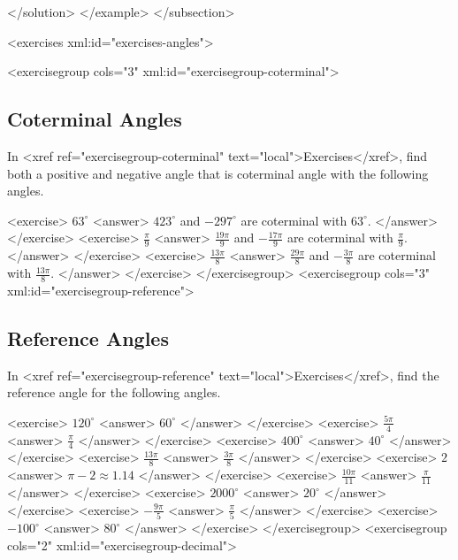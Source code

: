       </solution>
    </example>
  </subsection>

    <exercises xml:id="exercises-angles">

    <exercisegroup cols="3" xml:id="exercisegroup-coterminal">
      \subsection*{Coterminal Angles}
        
            In <xref ref="exercisegroup-coterminal" text="local">Exercises</xref>, find both a positive and negative angle that is coterminal angle with the following angles.
        
        <exercise>
                $63^{\circ}$
            <answer>
               $423^{\circ}$ and $-297^{\circ}$ are coterminal with $63^{\circ}$.
            </answer>
        </exercise>
        <exercise>
                $\frac{\pi}{9}$
                <answer>
                    $\frac{19\pi}{9}$ and $-\frac{17\pi}{9}$ are coterminal with $\frac{\pi}{9}$.
                </answer>
        </exercise>
        <exercise>
                $\frac{13\pi}{8}$
                <answer>
                    $\frac{29\pi}{8}$ and $-\frac{3\pi}{8}$ are coterminal with $\frac{13\pi}{8}$.
                </answer>
        </exercise>
    </exercisegroup>
    <exercisegroup cols="3" xml:id="exercisegroup-reference">
      \subsection*{Reference Angles}
        
            In <xref ref="exercisegroup-reference" text="local">Exercises</xref>, find the reference angle for the following angles.
        
        <exercise>
                $120^{\circ}$
            <answer>
               $60^{\circ}$
            </answer>
        </exercise>
        <exercise>
                $\frac{5\pi}{4}$
                <answer>
                    $\frac{\pi}{4}$
                </answer>
        </exercise>
        <exercise>
                $400^{\circ}$
                <answer>
                    $40^{\circ}$
                 </answer>
        </exercise>
        <exercise>
                $\frac{13\pi}{8}$
                <answer>
                    $\frac{3\pi}{8}$
                </answer>
        </exercise>
        <exercise>
                $2$
                <answer>
                    $\pi-2 \approx 1.14$
                </answer>
        </exercise>
        <exercise>
                $\frac{10\pi}{11}$
            <answer>
                $\frac{\pi}{11}$
            </answer>
        </exercise>
        <exercise>
                $2000^{\circ}$
            <answer>
                $20^{\circ}$
            </answer>
        </exercise>
        <exercise>
                $-\frac{9\pi}{5}$
            <answer>
                $\frac{\pi}{5}$
            </answer>
        </exercise>
        <exercise>
                $-100^{\circ}$
            <answer>
                $80^{\circ}$
            </answer>
        </exercise>
    </exercisegroup>
    <exercisegroup cols="2" xml:id="exercisegroup-decimal">
